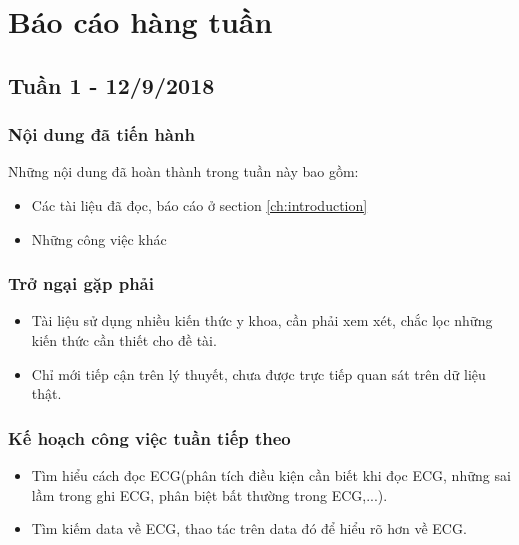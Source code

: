 \chapter*{Báo cáo hàng tuần}
\section{Tuần 1 - 12/9/2018}
\subsection{Nội dung đã tiến hành}
Những nội dung đã hoàn thành trong tuần này bao gồm:
\begin{itemize}
\item Các tài liệu đã đọc, báo cáo ở section \ref{ch:introduction}
\item Những công việc khác
\end{itemize}

\subsection{Trở ngại gặp phải}
\begin{itemize}
    \item Tài liệu sử dụng nhiều kiến thức y khoa, cần phải xem xét, chắc lọc những kiến thức cần thiết cho đề tài.
    \item Chỉ mới tiếp cận trên lý thuyết, chưa được trực tiếp quan sát trên dữ liệu thật.
\end{itemize}

\subsection{Kế hoạch công việc tuần tiếp theo}
\begin{itemize}
    \item Tìm hiểu cách đọc ECG(phân tích điều kiện cần biết khi đọc ECG, những sai lầm trong ghi ECG, phân biệt bất thường trong ECG,...).
    \item Tìm kiếm data về ECG, thao tác trên data đó để  hiểu rõ hơn về ECG.
\end{itemize}
